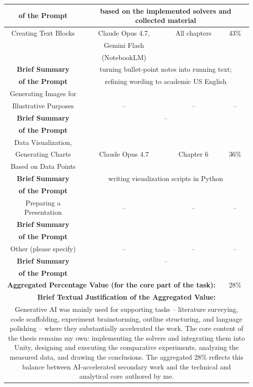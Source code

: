 {\begin{tabular}{|c|c|c|c|}
		\textbf{of the Prompt}  &\multicolumn{3}{|p{96mm}|}{based on the implemented solvers and collected material} \\ \hline \hline
		Creating Text Blocks & Claude Opus 4.7, & All chapters & 43\% \\
		                     & Gemini Flash & & \\
		                     & (NotebookLM) & & \\ \hline
		\textbf{Brief Summary}  &\multicolumn{3}{|p{96mm}|}{turning bullet-point notes into running text;} \\
		\textbf{of the Prompt}  &\multicolumn{3}{|p{96mm}|}{refining wording to academic US English} \\ \hline \hline
		Generating Images for & & & \\
		Illustrative Purposes & -- & -- & -- \\ \hline
		\textbf{Brief Summary}  &\multicolumn{3}{|p{96mm}|}{--} \\
		\textbf{of the Prompt}  &\multicolumn{3}{|p{96mm}|}{} \\ \hline \hline
		Data Visualization,  & & & \\
		Generating Charts & Claude Opus 4.7 & Chapter 6 & 36\% \\
		Based on Data Points & & & \\ \hline
		\textbf{Brief Summary}  &\multicolumn{3}{|p{96mm}|}{writing visualization scripts in Python} \\
		\textbf{of the Prompt}  &\multicolumn{3}{|p{96mm}|}{} \\ \hline \hline
		Preparing a Presentation & -- & -- & -- \\ \hline
		\textbf{Brief Summary}  &\multicolumn{3}{|p{96mm}|}{} \\
		\textbf{of the Prompt}  &\multicolumn{3}{|p{96mm}|}{} \\ \hline \hline
		Other (please specify) & -- & -- & -- \\ \hline
		\textbf{Brief Summary}  &\multicolumn{3}{|p{96mm}|}{--} \\
		\textbf{of the Prompt}  &\multicolumn{3}{|p{96mm}|}{} \\ \hline \hline
		\multicolumn{3}{|l|}{\textbf{Aggregated Percentage Value (for the core part of the task):}} & 28\% \\ \hline
		\multicolumn{4}{|p{140mm}|}{\textbf{Brief Textual Justification of the Aggregated Value:}} \\
		\multicolumn{4}{|p{140mm}|}{Generative AI was mainly used for supporting tasks -- literature surveying, code scaffolding, experiment brainstorming, outline structuring, and language polishing --  where they substantially accelerated the work. The core content of the thesis remains my own:  implementing the solvers and integrating them into Unity, designing and executing the comparative experiments, analyzing the measured data, and drawing the conclusions. The aggregated 28\% reflects this balance between AI-accelerated secondary work and the technical and analytical core authored by me.} \\ \hline

	\end{tabular}
} %

